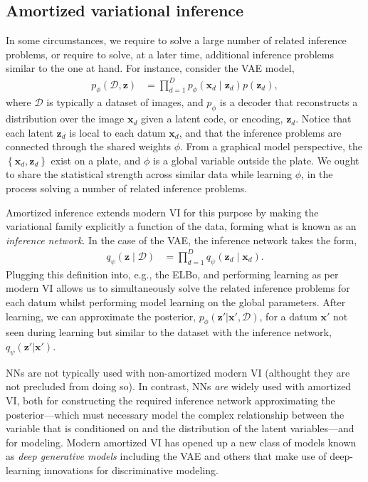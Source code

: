\subsection{Amortized variational inference}\label{sec:amortized-vi}
In some circumstances, we require to solve a large number of related inference problems, or require to solve, at a later time, additional inference problems similar to the one at hand. For instance, consider the VAE model,
\begin{align*}
	p_\phi(\mathcal{D},\mathbf{z}) &= \prod^D_{d=1}p_\phi(\mathbf{x}_d\mid\mathbf{z}_d)p(\mathbf{z}_d),
\end{align*}
where $\mathcal{D}$ is typically a dataset of images, and $p_\phi$ is a decoder that reconstructs a distribution over the image $\mathbf{x}_d$ given a latent code, or encoding, $\mathbf{z}_d$. Notice that each latent $\mathbf{z}_d$ is local to each datum $\mathbf{x}_d$, and that the inference problems are connected through the shared weights $\phi$. From a graphical model perspective, the $\left\{\mathbf{x}_d,\mathbf{z}_d\right\}$ exist on a plate, and $\phi$ is a global variable outside the plate. We ought to share the statistical strength across similar data while learning $\phi$, in the process solving a number of related inference problems.

Amortized inference \citep{dayan1995helmholtz, RezendeEtAl2014, KingmaWelling2013} extends modern VI for this purpose by making the variational family explicitly a function of the data, forming what is known as an \emph{inference network}. In the case of the VAE, the inference network takes the form,
\begin{align*}
	q_\psi(\mathbf{z}\mid\mathcal{D}) &= \prod^D_{d=1}q_\psi(\mathbf{z}_d\mid\mathbf{x}_d).
\end{align*}
Plugging this definition into, e.g., the ELBo, and performing learning as per modern VI allows us to simultaneously solve the related inference problems for each datum whilst performing model learning on the global parameters. After learning, we can approximate the posterior, $p_\phi(\mathbf{z}'|\mathbf{x}',\mathcal{D})$, for a datum $\mathbf{x}'$ not seen during learning but similar to the dataset with the inference network, $q_\psi(\mathbf{z}'|\mathbf{x}')$.

NNs are not typically used with non-amortized modern VI (althought they are not precluded from doing so). In contrast, NNs \emph{are} widely used with amortized VI, both for constructing the required inference network approximating the posterior---which must necessary model the complex relationship between the variable that is conditioned on and the distribution of the latent variables---and for modeling. Modern amortized VI has opened up a new class of models known as \emph{deep generative models} including the VAE and others \citep{GregorEtAl2015,eslami2016attend,bornschein2017variational} that make use of deep-learning innovations for discriminative modeling.

